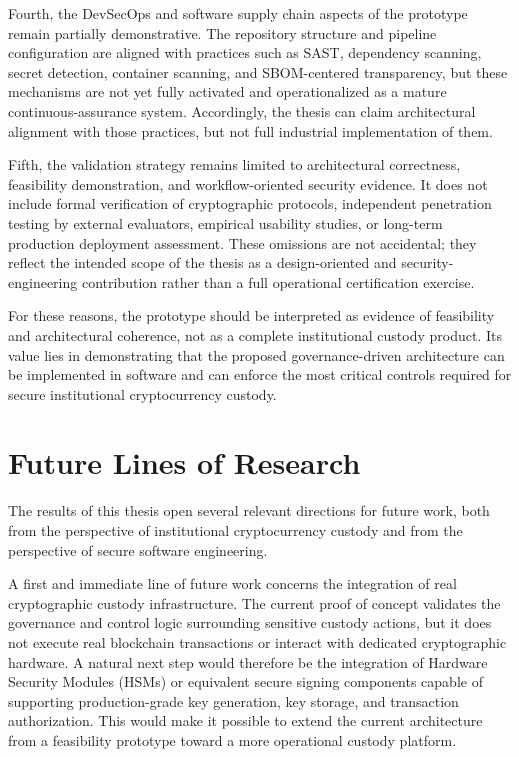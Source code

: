 \documentclass[12pt,a4paper]{report}
\begin{document}
Fourth, the DevSecOps and software supply chain aspects of the prototype remain partially demonstrative. The repository structure and pipeline configuration are aligned with practices such as SAST, dependency scanning, secret detection, container scanning, and SBOM-centered transparency, but these mechanisms are not yet fully activated and operationalized as a mature continuous-assurance system. Accordingly, the thesis can claim architectural alignment with those practices, but not full industrial implementation of them.

Fifth, the validation strategy remains limited to architectural correctness, feasibility demonstration, and workflow-oriented security evidence. It does not include formal verification of cryptographic protocols, independent penetration testing by external evaluators, empirical usability studies, or long-term production deployment assessment. These omissions are not accidental; they reflect the intended scope of the thesis as a design-oriented and security-engineering contribution rather than a full operational certification exercise.

For these reasons, the prototype should be interpreted as evidence of feasibility and architectural coherence, not as a complete institutional custody product. Its value lies in demonstrating that the proposed governance-driven architecture can be implemented in software and can enforce the most critical controls required for secure institutional cryptocurrency custody.

\section{Future Lines of Research}

The results of this thesis open several relevant directions for future work, both from the perspective of institutional cryptocurrency custody and from the perspective of secure software engineering.

A first and immediate line of future work concerns the integration of real cryptographic custody infrastructure. The current proof of concept validates the governance and control logic surrounding sensitive custody actions, but it does not execute real blockchain transactions or interact with dedicated cryptographic hardware. A natural next step would therefore be the integration of Hardware Security Modules (HSMs) or equivalent secure signing components capable of supporting production-grade key generation, key storage, and transaction authorization. This would make it possible to extend the current architecture from a feasibility prototype toward a more operational custody platform.
\end{document}
